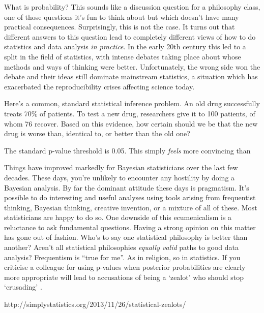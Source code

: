 \documentclass[a4paper, 12pt]{article}
\title{}
\author{Brendon J. Brewer}
\begin{document}
\sffamily
\maketitle

What is probability? This sounds like a discussion question for a
philosophy class, one of those questions it's fun to think about but which
doesn't have many practical consequences. Surprisingly, this is not the case.
It turns out that different answers to this question lead to completely
different views of how to do statistics and data analysis {\em in practice}.
In the early 20th century this led to a split in the field of statistics,
with intense debates taking place about whose methods and ways of thinking
were better. Unfortunately, the wrong side won the debate and their
ideas still dominate mainstream statistics, a situation which
has exacerbated the reproducibility crises affecting science today.

Here's a common, standard statistical inference problem. An old drug
successfully treats 70\% of patients. To test a new drug, researchers give it
to 100 patients, of whom 76 recover. Based on this evidence, how certain
should we be that the new drug is worse than, identical to, or better than the
old one?


The standard p-value threshold is 0.05. This simply {\em feels} more
convincing than 

Things have improved markedly for Bayesian statisticians over the last few
decades. These days, you're unlikely to encounter any hostility by doing
a Bayesian analysis. By far the dominant attitude these days
is pragmatism. It's possible to do interesting and useful analyses using tools
arising from frequentist thinking, Bayesian thinking, creative invention, or
a mixture of all of these. Most statisticians are happy to do so.
One downside of this ecumenicalism is a reluctance to ask fundamental
questions. Having a strong opinion on this matter has gone out of fashion.
Who's to say one statistical philosophy is better than
another? Aren't all statistical philosophies {\it equally valid} paths to good
data analysis? Frequentism is ``true for me''. As in religion, so in statistics.
If you criticise a colleague for using p-values when posterior probabilities
are clearly more appropriate will lead to accusations of being a `zealot' who
should stop `crusading' \citep{simply_statistics}.

\begin{thebibliography}{999} %
http://simplystatistics.org/2013/11/26/statistical-zealots/

\end{thebibliography}
\end{document}

